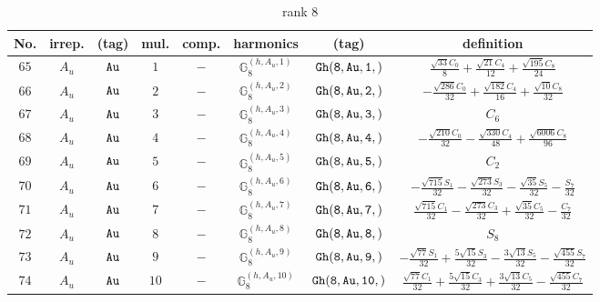 \documentclass[fleqn,8pt]{jsarticle}
\begin{document}
\begin{table}[ht!]
\begin{center}
\caption{rank 8}
\renewcommand{\arraystretch}{1.3}
\begin{tabular}{cccccccc} \hline \hline
No. & irrep. & (tag) & mul. & comp. & harmonics & (tag) & definition \\ \hline
$ 65 $ & $ A_{u} $ & $ {\tt Au} $ & $ 1 $ & $ - $ & $ \mathbb{G}_{8}^{(h,A_{u},1)} $ & $ {\tt Gh(8,Au,1,)} $ & $ \frac{\sqrt{33} C_{0}}{8} + \frac{\sqrt{21} C_{4}}{12} + \frac{\sqrt{195} C_{8}}{24} $ \\
$ 66 $ & $ A_{u} $ & $ {\tt Au} $ & $ 2 $ & $ - $ & $ \mathbb{G}_{8}^{(h,A_{u},2)} $ & $ {\tt Gh(8,Au,2,)} $ & $ - \frac{\sqrt{286} C_{0}}{32} + \frac{\sqrt{182} C_{4}}{16} + \frac{\sqrt{10} C_{8}}{32} $ \\
$ 67 $ & $ A_{u} $ & $ {\tt Au} $ & $ 3 $ & $ - $ & $ \mathbb{G}_{8}^{(h,A_{u},3)} $ & $ {\tt Gh(8,Au,3,)} $ & $ C_{6} $ \\
$ 68 $ & $ A_{u} $ & $ {\tt Au} $ & $ 4 $ & $ - $ & $ \mathbb{G}_{8}^{(h,A_{u},4)} $ & $ {\tt Gh(8,Au,4,)} $ & $ - \frac{\sqrt{210} C_{0}}{32} - \frac{\sqrt{330} C_{4}}{48} + \frac{\sqrt{6006} C_{8}}{96} $ \\
$ 69 $ & $ A_{u} $ & $ {\tt Au} $ & $ 5 $ & $ - $ & $ \mathbb{G}_{8}^{(h,A_{u},5)} $ & $ {\tt Gh(8,Au,5,)} $ & $ C_{2} $ \\
$ 70 $ & $ A_{u} $ & $ {\tt Au} $ & $ 6 $ & $ - $ & $ \mathbb{G}_{8}^{(h,A_{u},6)} $ & $ {\tt Gh(8,Au,6,)} $ & $ - \frac{\sqrt{715} S_{1}}{32} - \frac{\sqrt{273} S_{3}}{32} - \frac{\sqrt{35} S_{5}}{32} - \frac{S_{7}}{32} $ \\
$ 71 $ & $ A_{u} $ & $ {\tt Au} $ & $ 7 $ & $ - $ & $ \mathbb{G}_{8}^{(h,A_{u},7)} $ & $ {\tt Gh(8,Au,7,)} $ & $ \frac{\sqrt{715} C_{1}}{32} - \frac{\sqrt{273} C_{3}}{32} + \frac{\sqrt{35} C_{5}}{32} - \frac{C_{7}}{32} $ \\
$ 72 $ & $ A_{u} $ & $ {\tt Au} $ & $ 8 $ & $ - $ & $ \mathbb{G}_{8}^{(h,A_{u},8)} $ & $ {\tt Gh(8,Au,8,)} $ & $ S_{8} $ \\
$ 73 $ & $ A_{u} $ & $ {\tt Au} $ & $ 9 $ & $ - $ & $ \mathbb{G}_{8}^{(h,A_{u},9)} $ & $ {\tt Gh(8,Au,9,)} $ & $ - \frac{\sqrt{77} S_{1}}{32} + \frac{5 \sqrt{15} S_{3}}{32} - \frac{3 \sqrt{13} S_{5}}{32} - \frac{\sqrt{455} S_{7}}{32} $ \\
$ 74 $ & $ A_{u} $ & $ {\tt Au} $ & $ 10 $ & $ - $ & $ \mathbb{G}_{8}^{(h,A_{u},10)} $ & $ {\tt Gh(8,Au,10,)} $ & $ \frac{\sqrt{77} C_{1}}{32} + \frac{5 \sqrt{15} C_{3}}{32} + \frac{3 \sqrt{13} C_{5}}{32} - \frac{\sqrt{455} C_{7}}{32} $ \\

\end{tabular}
\end{center}
\end{table}
\end{document}
